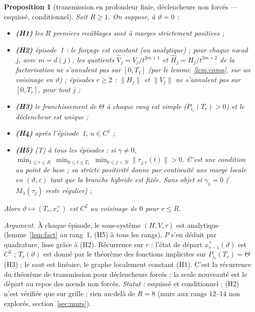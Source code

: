 \documentclass[11pt,a4paper]{article}
\newtheorem{proposition}{Proposition}
\theoremstyle{remark}
\newcommand{\vth}{\vartheta}
\begin{document}
\begin{proposition}[transmission en profondeur finie, d\'eclencheurs non forc\'es --- esquiss\'e, conditionnel]\label{prop:fini}
Soit $R\ge1$. On suppose, \`a $\vth=0$ :
\begin{itemize}[leftmargin=1.6em,itemsep=1pt]
\item \textbf{(H1)} les $R$ premiers recâblages sont \`a marges strictement positives ;
\item \textbf{(H2)} \emph{\'episode~1} : le for\c{c}age est constant (ou analytique) ; \emph{pour chaque n\oe ud $j$}, avec $m=d(j)$, les quotients $\hat V_j=V_j/t^{2m+1}$ et $\hat H_j=H_j/t^{2m+2}$ de la factorisation ne s'annulent pas sur $[0,T_1]$ (par le lemme~\ref{lem:comp}, sur un voisinage en $\vth$) ; \emph{\'episodes $r\ge2$} : $\lVert H_j\rVert$ et $\lVert V_j\rVert$ ne s'annulent pas sur $[0,T_r]$, pour tout $j$ ;
\item \textbf{(H3)} le franchissement de $\Theta$ \`a chaque rang est simple ($\dot P_{i_r}(T_r)>0$) et le d\'eclencheur est unique ;
\item \textbf{(H4)} apr\`es l'\'episode~1, $u\in C^1$ ;
\item \textbf{(H5)} (T) \`a \emph{tous} les \'episodes : si $\bar\gamma\neq0$, $\displaystyle\min_{1\le r\le R}\ \min_{0\le t\le T_r}\ \min_{0\le j<N}\lVert\tau_{j,r}(t)\rVert>0$. C'est une condition au point de base ; sa stricte positivit\'e donne par continuit\'e une marge locale en $(\vth,\varepsilon)$ tant que la branche hybride est fix\'ee. Sans objet si $\gamma_1=0$ ($M_\lambda(\tau_j)$ reste r\'egulier) ;
\end{itemize}
Alors $\vth\mapsto(T_r,x_r^+)$ est $C^2$ au voisinage de $0$ pour $r\le R$.
\end{proposition}
\noindent\emph{Argument.} \`A chaque \'episode, le sous-syst\`eme $(H,V,\tau)$ est analytique (lemme~\ref{lem:fact} au rang~1, (H5) \`a tous les rangs), $P$ s'en d\'eduit par quadrature, lisse gr\^ace \`a (H2). R\'ecurrence sur $r$ : l'\'etat de d\'epart $x_{r-1}^+(\vth)$ est $C^2$ ; $T_r(\vth)$ est donn\'e par le th\'eor\`eme des fonctions implicites sur $P_{i_r}(T_r)=\Theta$ (H3) ; le saut est lin\'eaire, le graphe localement constant (H1). C'est la r\'ecurrence du th\'eor\`eme de transmission pour d\'eclencheurs forc\'es ; la seule nouveaut\'e est le d\'epart au repos des n\oe uds non forc\'es. \emph{Statut :} esquiss\'e et conditionnel ; (H2) n'est v\'erifi\'ee que sur grille ; rien au-del\`a de $R=8$ (murs aux rangs $12$--$14$ non explor\'es, section~\ref{sec:murs}).
\end{document}
